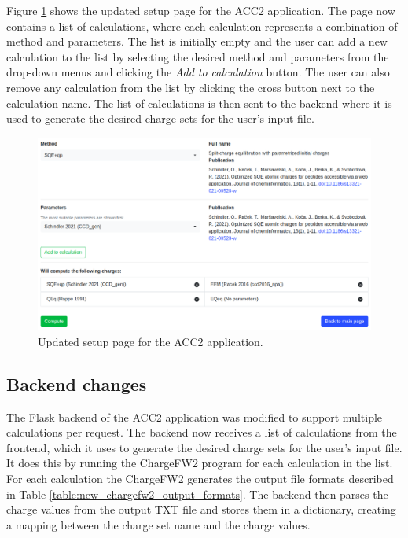 \documentclass[
  digital,     %
  oneside,     %
  nosansbold,  %
  nocolorbold, %
  lof,         %
  lot,         %
]{fithesis4}
\begin{document}
Figure \ref{fig:new_setup} shows the updated setup page for the ACC2 application. The page now contains a list of calculations, where each calculation represents a combination of method and parameters. The list is initially empty and the user can add a new calculation to the list by selecting the desired method and parameters from the drop-down menus and clicking the \textit{Add to calculation} button. The user can also remove any calculation from the list by clicking the cross button next to the calculation name. The list of calculations is then sent to the backend where it is used to generate the desired charge sets for the user's input file.

\begin{figure}[htbp]
  \begin{center}
    \includegraphics[width=\textwidth]{figures/new_setup.png}
  \end{center}
  \caption{Updated setup page for the ACC2 application.}
  \label{fig:new_setup}
\end{figure}

\subsection{Backend changes}

The Flask backend of the ACC2 application was modified to support multiple calculations per request. The backend now receives a list of calculations from the frontend, which it uses to generate the desired charge sets for the user's input file. It does this by running the ChargeFW2 program for each calculation in the list. For each calculation the ChargeFW2 generates the output file formats described in Table \ref{table:new_chargefw2_output_formats}. The backend then parses the charge values from the output TXT file and stores them in a dictionary, creating a mapping between the charge set name and the charge values.
\end{document}
